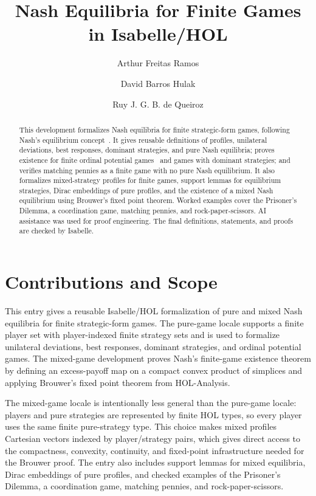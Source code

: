 \documentclass[11pt,a4paper]{article}
\begin{document}
\title{Nash Equilibria for Finite Games in Isabelle/HOL}
\author{Arthur Freitas Ramos \and David Barros Hulak \and Ruy J. G. B. de Queiroz}
\maketitle

\begin{abstract}
This development formalizes Nash equilibria for finite strategic-form games,
following Nash's equilibrium concept~\cite{Nash1950,Nash1951}.  It gives
reusable definitions of profiles, unilateral deviations, best responses,
dominant strategies, and pure Nash equilibria; proves existence for finite
ordinal potential games~\cite{MondererShapley1996} and games with dominant
strategies; and verifies matching pennies as a finite game with no pure Nash
equilibrium.  It also formalizes mixed-strategy profiles for finite games,
support lemmas for equilibrium strategies, Dirac embeddings of pure profiles,
and the existence of a mixed Nash equilibrium using Brouwer's fixed point
theorem.  Worked examples cover the Prisoner's Dilemma, a coordination game,
matching pennies, and rock-paper-scissors.  AI assistance was used for proof
engineering.  The final definitions, statements, and proofs are checked by
Isabelle.
\end{abstract}

\section*{Contributions and Scope}

This entry gives a reusable Isabelle/HOL formalization of pure and mixed Nash
equilibria for finite strategic-form games.  The pure-game locale supports a
finite player set with player-indexed finite strategy sets and is used to
formalize unilateral deviations, best responses, dominant strategies, and
ordinal potential games.  The mixed-game development proves Nash's finite-game
existence theorem by defining an excess-payoff map on a compact convex product
of simplices and applying Brouwer's fixed point theorem from HOL-Analysis.

The mixed-game locale is intentionally less general than the pure-game locale:
players and pure strategies are represented by finite HOL types, so every
player uses the same finite pure-strategy type.  This choice makes mixed
profiles Cartesian vectors indexed by player/strategy pairs, which gives direct
access to the compactness, convexity, continuity, and fixed-point infrastructure
needed for the Brouwer proof.  The entry also includes support lemmas for mixed
equilibria, Dirac embeddings of pure profiles, and checked examples of the
Prisoner's Dilemma, a coordination game, matching pennies, and
rock-paper-scissors.
\end{document}
